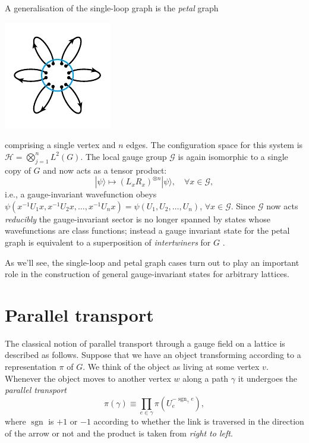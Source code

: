 \documentclass[twocolumn,lengthcheck,superscriptaddress]{revtex4-1}
\newcommand{\sgn}{\operatorname{sgn}}
\theoremstyle{definition}
\theoremstyle{remark}
\begin{document}
A generalisation of the single-loop graph is the \emph{petal} graph 
\begin{center}
	\includegraphics{petal.pdf}
\end{center}
comprising a single vertex and $n$ edges. The configuration space for this system is $\mathcal{H} = \bigotimes_{j=1}^n L^2(G)$. The local gauge group $\mathcal{G}$ is again isomorphic to a single copy of $G$ and now acts as a tensor product:
\begin{equation} \label{eq:petalinvariance}
	|\psi\rangle \mapsto (L_xR_x)^{\otimes n} |\psi\rangle, \quad \forall x\in \mathcal{G},
\end{equation}
i.e., a gauge-invariant wavefunction obeys $\psi(x^{-1}U_1x, x^{-1}U_2x, \ldots, x^{-1}U_nx) = \psi(U_1, U_2, \ldots, U_n)$, $\forall x\in \mathcal{G}$.
Since $\mathcal{G}$ now acts \emph{reducibly} the gauge-invariant sector is no longer spanned by states whose wavefunctions are class functions; instead a gauge invariant state for the petal graph is equivalent to a superposition of \emph{intertwiners} for $G$ \cite{baez:1996a}. 


As we'll see, the single-loop and petal graph cases turn out to play an important role in the construction of general gauge-invariant states for arbitrary lattices.

\section{Parallel transport}\label{sec:paralleltx}
The classical notion of parallel transport through a gauge field on a lattice is described as follows. Suppose that we have an object transforming according to a representation $\pi$ of $G$. We think of the object as living at some vertex $v$. Whenever the object moves to another vertex $w$ along a path $\gamma$ it undergoes the \emph{parallel transport}  
\begin{equation}\label{eq:ugamma}
	\pi(\gamma) \equiv \prod_{e\in \gamma} \pi(U_{e}^{-\sgn_\gamma{e}}),
\end{equation}
where $\sgn$ is $+1$ or $-1$ according to whether the link is traversed in the direction of the arrow or not and the product is taken from \emph{right to left}.
\end{document}
